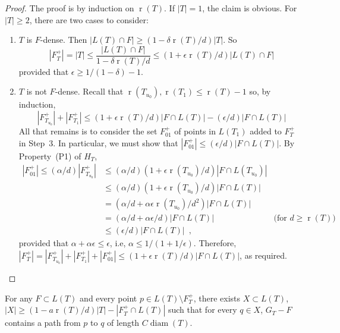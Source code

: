 \documentclass{patmorin}
\DeclareMathOperator{\rank}{r}
\DeclareMathOperator{\diam}{diam}
\begin{document}
\begin{proof}
  The proof is by induction on $\rank(T)$. If $|T|=1$, the claim is
  obvious. For $|T|\ge 2$, there are two cases to consider:
  \begin{enumerate}
    \item $T$ is $F$-dense. Then  $|L(T)\cap F|\ge
    (1-\delta\rank(T)/d)|T|$.  So
     \[
       |F^+_T|=|T|
	  \le \frac{|L(T)\cap F|}{1-\delta\rank(T)/d} 
          \le (1+\epsilon\rank(T)/d)|L(T)\cap F|
     \]
     provided that $\epsilon \ge 1/(1-\delta)-1$.

    \item $T$ is not $F$-dense. Recall that
    $\rank(T_{u_0}),\rank(T_1)\le\rank(T)-1$ so, by induction,
     \[
        |F^+_{T_{u_0}}|	+ |F^+_{T_{1}}| 
          \le (1+\epsilon\rank(T)/d)|F\cap L(T)| - (\epsilon/d)|F\cap L(T)|
     \]
     All that remains is to consider the set $F^+_{01}$ of points in 
     $L(T_1)$ added to $F^+_T$ in Step~3.  In particular, we must show that
     $|F^+_{01}|\le (\epsilon/d)|F\cap L(T)|$. By Property~(P1) of $H_T$,
     \begin{align*}
      |F^+_{01}| \le (\alpha/d)|F^+_{T_{u_0}}|
        & \le (\alpha/d)(1+\epsilon\rank(T_{u_0})/d)|F\cap L(T_{u_0})| \\
        & \le (\alpha/d)(1+\epsilon\rank(T_{u_0})/d)|F\cap L(T)|\\
        & = (\alpha/d+\alpha\epsilon\rank(T_{u_0})/d^2)|F\cap L(T)| \\
        & = (\alpha/d+\alpha\epsilon/d)|F\cap L(T)| 
	     & \text{(for $d\ge \rank(T)$)} \\
	& \le (\epsilon/d)|F\cap L(T)| \enspace ,
   \end{align*}
   provided that $\alpha+\alpha\epsilon \le \epsilon$, i.e, 
   $\alpha \le 1/(1+1/\epsilon)$. Therefore, 
   $|F^+_T| = |F^+_{T_{u_0}}| + |F^+_{T_1}| + |F^+_{01}| \le (1+\epsilon\rank(T)/d)|F\cap L(T)|$, as required. \qedhere
   \end{enumerate}
\end{proof}


\begin{clm}
  For any $F\subset L(T)$ and every point $p\in L(T)\setminus F^+_T$,
	there exists $X\subset L(T)$, $|X|\ge (1-a\rank(T)/d)|T|-|F^+_T\cap L(T)|$
  such that for every $q\in X$, $G_T-F$
  contains a path from $p$ to $q$ of length $C\diam(T)$.
\end{clm}
\end{document}
